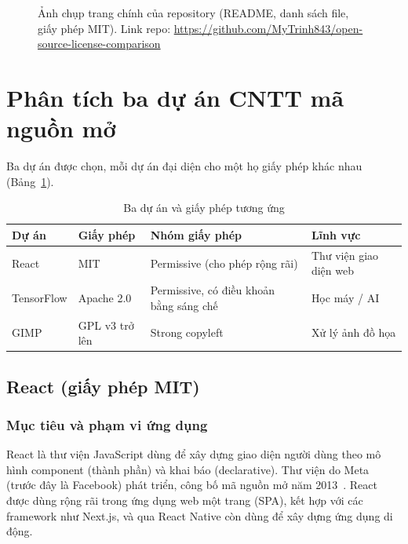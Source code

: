 \documentclass[12pt,a4paper]{article}
\begin{document}
\begin{figure}[htbp]
\centering
{}
\caption{Ảnh chụp trang chính của repository (README, danh sách file, giấy phép MIT). Link repo: \url{https://github.com/MyTrinh843/open-source-license-comparison}}\label{fig:repo}
\end{figure}

\section{Phân tích ba dự án CNTT mã nguồn mở}\label{sec:projects}
Ba dự án được chọn, mỗi dự án đại diện cho một họ giấy phép khác nhau (Bảng~\ref{tab:three}).

\begin{table}[htbp]
\centering
\caption{Ba dự án và giấy phép tương ứng}\label{tab:three}
\renewcommand{\arraystretch}{1.25}
\begin{tabularx}{\textwidth}{@{}l l X l@{}}
\toprule
\textbf{Dự án} & \textbf{Giấy phép} & \textbf{Nhóm giấy phép} & \textbf{Lĩnh vực}\\\midrule
React & MIT & Permissive (cho phép rộng rãi) & Thư viện giao diện web\\
TensorFlow & Apache 2.0 & Permissive, có điều khoản bằng sáng chế & Học máy / AI\\
GIMP & GPL v3 trở lên & Strong copyleft & Xử lý ảnh đồ họa\\\bottomrule
\end{tabularx}
\end{table}

\subsection{React (giấy phép MIT)}\label{sec:react}
\subsubsection*{Mục tiêu và phạm vi ứng dụng}
React là thư viện JavaScript dùng để xây dựng giao diện người dùng theo mô hình component (thành phần) và khai báo (declarative). Thư viện do Meta (trước đây là Facebook) phát triển, công bố mã nguồn mở năm 2013~\cite{react}. React được dùng rộng rãi trong ứng dụng web một trang (SPA), kết hợp với các framework như Next.js, và qua React Native còn dùng để xây dựng ứng dụng di động.
\end{document}
